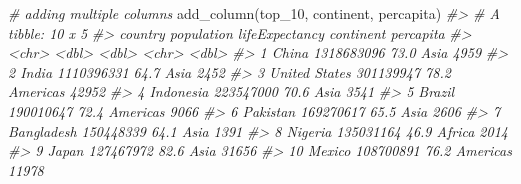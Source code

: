 \documentclass[
]{book}
\newenvironment{Shaded}{\begin{snugshade}}{\end{snugshade}}
\newcommand{\CommentTok}[1]{\textcolor[rgb]{0.56,0.35,0.01}{\textit{#1}}}
\newcommand{\FunctionTok}[1]{\textcolor[rgb]{0.00,0.00,0.00}{#1}}
\newcommand{\NormalTok}[1]{#1}
\begin{document}
\begin{Shaded}
\begin{Highlighting}[]
\CommentTok{\# adding multiple columns}
\FunctionTok{add\_column}\NormalTok{(top\_10, continent, percapita)}
\CommentTok{\#\textgreater{} \# A tibble: 10 x 5}
\CommentTok{\#\textgreater{}    country       population lifeExpectancy continent percapita}
\CommentTok{\#\textgreater{}    \textless{}chr\textgreater{}              \textless{}dbl\textgreater{}          \textless{}dbl\textgreater{} \textless{}chr\textgreater{}         \textless{}dbl\textgreater{}}
\CommentTok{\#\textgreater{}  1 China         1318683096           73.0 Asia           4959}
\CommentTok{\#\textgreater{}  2 India         1110396331           64.7 Asia           2452}
\CommentTok{\#\textgreater{}  3 United States  301139947           78.2 Americas      42952}
\CommentTok{\#\textgreater{}  4 Indonesia      223547000           70.6 Asia           3541}
\CommentTok{\#\textgreater{}  5 Brazil         190010647           72.4 Americas       9066}
\CommentTok{\#\textgreater{}  6 Pakistan       169270617           65.5 Asia           2606}
\CommentTok{\#\textgreater{}  7 Bangladesh     150448339           64.1 Asia           1391}
\CommentTok{\#\textgreater{}  8 Nigeria        135031164           46.9 Africa         2014}
\CommentTok{\#\textgreater{}  9 Japan          127467972           82.6 Asia          31656}
\CommentTok{\#\textgreater{} 10 Mexico         108700891           76.2 Americas      11978}


\end{Highlighting}
\end{Shaded}
\end{document}
